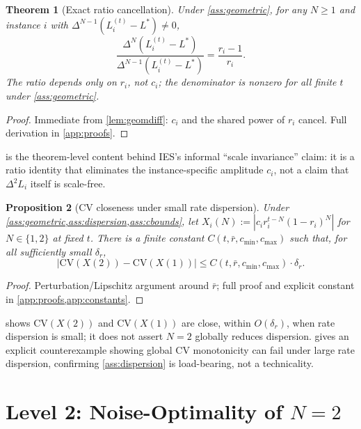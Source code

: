 \documentclass{article}
\theoremstyle{plain}
\newtheorem{theorem}{Theorem}[section]
\newtheorem{proposition}[theorem]{Proposition}
\theoremstyle{definition}
\theoremstyle{remark}
\newcommand{\CV}{\mathrm{CV}}
\begin{document}
\begin{theorem}[Exact ratio cancellation]
\label{thm:ratio}
Under \cref{ass:geometric}, for any $N\ge1$ and instance $i$ with $\Delta^{N-1}(L_i^{(t)}-L^*)\ne0$,
\begin{equation}
\label{eq:ratio}
\frac{\Delta^N(L_i^{(t)}-L^*)}{\Delta^{N-1}(L_i^{(t)}-L^*)} = \frac{r_i-1}{r_i}.
\end{equation}
The ratio depends only on $r_i$, not $c_i$; the denominator is nonzero for all finite $t$ under \cref{ass:geometric}.
\end{theorem}
\begin{proof}
Immediate from \cref{lem:geomdiff}: $c_i$ and the shared power of $r_i$ cancel. Full derivation in \cref{app:proofs}.
\end{proof}

 is the theorem-level content behind IES's informal ``scale invariance'' claim: it is a ratio identity that eliminates the instance-specific amplitude $c_i$, not a claim that $\Delta^2 L_i$ itself is scale-free.

\begin{proposition}[CV closeness under small rate dispersion]
\label{prop:cv}
Under \cref{ass:geometric,ass:dispersion,ass:cbounds}, let $X_i(N) := |c_i r_i^{t-N}(1-r_i)^N|$ for $N\in\{1,2\}$ at fixed $t$. There is a finite constant $C(t,\bar r,c_{\min},c_{\max})$ such that, for all sufficiently small $\delta_r$,
\begin{equation}
\big|\CV(X(2)) - \CV(X(1))\big| \le C(t,\bar r,c_{\min},c_{\max})\cdot\delta_r.
\end{equation}
\end{proposition}
\begin{proof}
Perturbation/Lipschitz argument around $\bar r$; full proof and explicit constant in \cref{app:proofs,app:constants}.
\end{proof}

 shows $\CV(X(2))$ and $\CV(X(1))$ are close, within $O(\delta_r)$, when rate dispersion is small; it does not assert $N=2$ globally reduces dispersion.  gives an explicit counterexample showing global CV monotonicity can fail under large rate dispersion, confirming \cref{ass:dispersion} is load-bearing, not a technicality.

\section{Level 2: Noise-Optimality of $N=2$}
\label{sec:level2}
\end{document}
